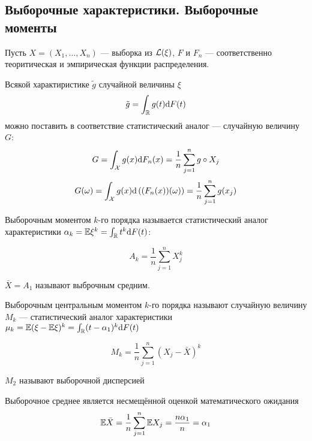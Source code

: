 \subsection{Выборочные характеристики. Выборочные моменты}

Пусть $X = (X_1, \dotsc, X_n)$ --- выборка из $\mathcal L(\xi)$,
$F$ и $F_n$ --- соответственно теоритическая и эмпирическая функции распределения.

Всякой характиристике $\tilde g$ случайной величины $\xi$
$$\tilde g = \int_\mathbb R g(t) \mathrm d F(t)$$
можно поставить в соответствие статистический аналог
--- случайную величину $G$:
$$G = \int_\mathcal X g(x) \mathrm d F_n(x) = \frac{1}{n} \sum_{j=1}^n g\circ X_j$$
$$G(\omega)
= \int_\mathcal X g(x) \mathrm d\left((F_n(x))(\omega)\right)
= \frac{1}{n} \sum_{j=1}^n g(x_j)$$

Выборочным моментом $k$-го порядка называется
статистический аналог характеристики $\alpha_k = \mathbb E \xi^k = \int_\mathbb R t^k \mathrm d F(t)$:

$$A_k = \frac{1}{n} \sum_{j=1}^n X_j^k$$

$\bar X = A_1$ называют выброчным средним.

Выборочным центральным моментом $k$-го порядка
называют случайную величину $M_k$
--- статистический аналог характеристики $\mu_k = \mathbb E (\xi - \mathbb E \xi)^k = \int_\mathbb R (t - \alpha_1)^k \mathrm d F(t)$

$$M_k = \frac{1}{n} \sum_{j=1}^n \left( X_j - \bar X \right)^k$$

$M_2$ называют выборочной дисперсией

\begin{nb}{Выборочное среднее является несмещённой оценкой математического ожидания}
$$\mathbb E \bar X = \frac{1}{n}\sum_{j=1}^n \mathbb E X_j = \frac{n \alpha_1}{n} = \alpha_1$$
\end{nb}
